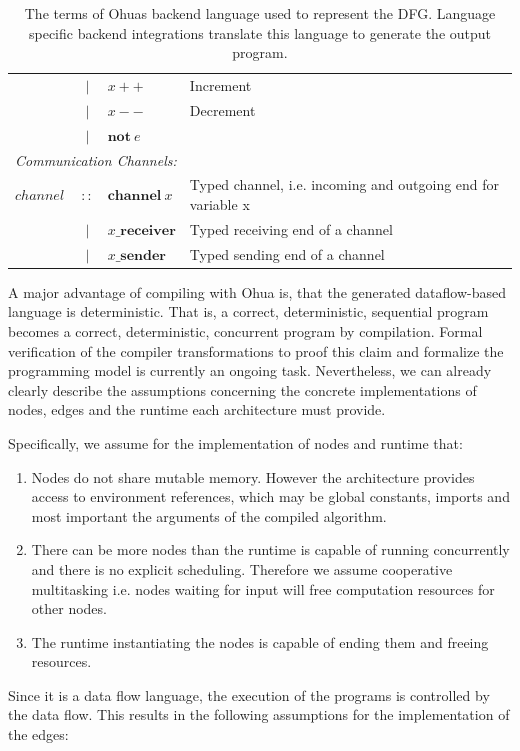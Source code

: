 \begin{table}[ht]
{\begin{tabular}{l c l l}
        & $|$ & $ x++$ & Increment \\
        & $|$ & $ x--$ & Decrement \\
        & $|$ & $ \textbf{not}\ e$ & \\
        \multicolumn{4}{l}{\emph{Communication Channels:}}\\
        $channel\ $& $::$ &$\textbf{channel}\ x$& Typed channel, i.e. incoming and outgoing end for variable x\\
        & $|$ &$x\textbf{\_receiver}$& Typed receiving end of a  channel  \\
        & $|$ &$x\textbf{\_sender}$ &Typed sending end of a channel  \\
    \end{tabular}%
    }
    \caption{The terms of Ohuas backend language used to represent the DFG. Language specific backend integrations translate this language to generate the output program.}
    \label{tab:DFGdef}
\end{table}

A major advantage of compiling with Ohua is, that the generated dataflow-based language is deterministic. That is, a correct, deterministic, sequential program becomes a correct, deterministic, concurrent program by compilation. Formal verification of the compiler transformations to proof this claim and formalize the programming model is currently an ongoing task. Nevertheless, we can already clearly describe the assumptions concerning the concrete implementations of nodes, edges and the runtime each architecture must provide.

Specifically, we assume for the implementation of nodes and runtime  that:
\begin{enumerate}
    \item Nodes do not share mutable memory. However the architecture provides access to environment references, which may be global constants, imports and most important the arguments of the compiled algorithm.
    \item There can be more nodes than the runtime is capable of running concurrently and there is no explicit scheduling. Therefore we assume cooperative multitasking i.e. nodes waiting for input will free computation resources for other nodes.
    \item The runtime instantiating the nodes is capable of ending them and freeing resources.
\end{enumerate}

Since it is a data flow language, the execution of the programs is controlled by the data flow. This results in the following assumptions for the implementation of the edges: 

